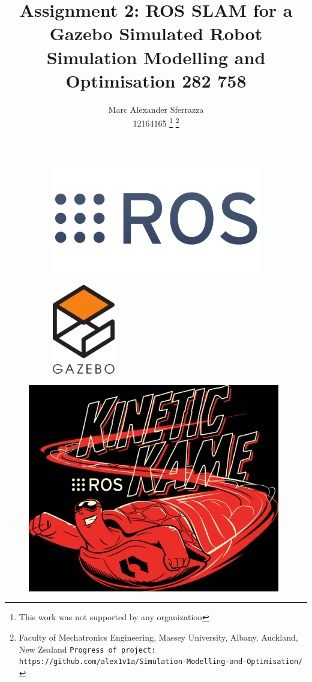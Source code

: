 \documentclass[a4paper, 10pt]{IEEEconf}
\title{\LARGE \bf Assignment 2: ROS SLAM for a Gazebo Simulated Robot\\Simulation Modelling and Optimisation 282 758}
\author{Marc Alexander Sferrazza \\ 12164165
\thanks{This work was not supported by any organization}
\thanks{Faculty of Mechatronics Engineering, Massey University, Albany, Auckland, New Zealand
        {\tt\small Progress of project: https://github.com/alex1v1a/Simulation-Modelling-and-Optimisation/} } }
\begin{document}
\maketitle
\begin{figure}[h]
\begin{subfigure}{0.5\textwidth}
\includegraphics[width=1.5\textwidth, left]{images/ROS} 
\label{fig:ROS}
\end{subfigure}
\begin{subfigure}{0.5\textwidth}
\includegraphics[width=0.3\textwidth, right]{images/gazebo}
\label{fig:Gazebo}
\end{subfigure}
\end{figure}
\begin{figure}[H]
  \begin{center}
  \includegraphics[width=110mm]{images/kinetic}
  \label{fig:kinetic}
  \end{center}
\end{figure}
\thispagestyle{empty}
\pagestyle{plain}
\end{document}
